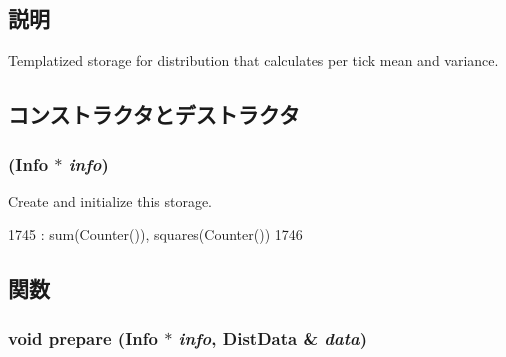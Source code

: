 \subsection{説明}
Templatized storage for distribution that calculates per tick mean and variance. 

\subsection{コンストラクタとデストラクタ}
\hypertarget{classStats_1_1AvgSampleStor_a77c6cc4f1040b08cf4704c20f1c1cf43}{
\subsubsection[{AvgSampleStor}]{ ({\bf Info} $\ast$ {\em info})}}
\label{classStats_1_1AvgSampleStor_a77c6cc4f1040b08cf4704c20f1c1cf43}
Create and initialize this storage. 


\begin{DoxyCode}
1745         : sum(Counter()), squares(Counter())
1746     {}
\end{DoxyCode}


\subsection{関数}
\hypertarget{classStats_1_1AvgSampleStor_a2e5e3cd36b4a3d6ab774aed4e3fcd641}{
\subsubsection[{prepare}]{\setlength{\rightskip}{0pt plus 5cm}void prepare ({\bf Info} $\ast$ {\em info}, \/  {\bf DistData} \& {\em data})}}
\label{classStats_1_1AvgSampleStor_a2e5e3cd36b4a3d6ab774aed4e3fcd641}




